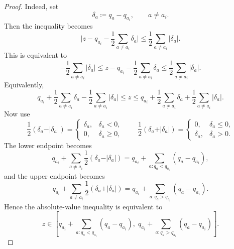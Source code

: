 \documentclass[10pt,a4paper]{amsart}
\begin{document}
\begin{proof}
Indeed, set
\[
    \delta_a \coloneqq q_a-q_{a_i},
    \qquad a\neq a_i.
\]
Then the inequality becomes
\[
    \lvert
        z-q_{a_i}
        -
        \frac12\sum_{a\neq a_i}\delta_a
    \rvert
    \le
    \frac12\sum_{a\neq a_i}\vert \delta_a\vert .
\]
This is equivalent to 
\[
    -\frac12\sum_{a\neq a_i}\vert \delta_a\vert 
    \le
    z-q_{a_i}-\frac12\sum_{a\neq a_i}\delta_a
    \le
    \frac12\sum_{a\neq a_i}\vert \delta_a\vert .
\]
Equivalently,
\[
    q_{a_i}
    +
    \frac12\sum_{a\neq a_i}\delta_a
    -
    \frac12\sum_{a\neq a_i}\vert \delta_a\vert 
    \le z \le
    q_{a_i}
    +
    \frac12\sum_{a\neq a_i}\delta_a
    +
    \frac12\sum_{a\neq a_i}\vert \delta_a\vert .
\]
Now use
\[
    \frac12(\delta_a-\vert \delta_a\vert )
    =
    \begin{cases}
        \delta_a, & \delta_a<0,\\
        0, & \delta_a\ge 0,
    \end{cases}
    \qquad
    \frac12(\delta_a+\vert \delta_a\vert )
    =
    \begin{cases}
        0, & \delta_a\le 0,\\
        \delta_a, & \delta_a>0.
    \end{cases}
\]
The lower endpoint becomes
\[
    q_{a_i}
    +
    \sum_{a\neq a_i}
    \frac12(\delta_a-\vert \delta_a\vert )
    =
    q_{a_i}
    +
    \sum_{a:q_a<q_{a_i}}
    (q_a-q_{a_i}),
\]
and the upper endpoint becomes
\[
    q_{a_i}
    +
    \sum_{a\neq a_i}
    \frac12(\delta_a+\vert \delta_a\vert )
    =
    q_{a_i}
    +
    \sum_{a:q_a>q_{a_i}}
    (q_a-q_{a_i}).
\]
Hence the absolute-value inequality is equivalent to
\[
    z
    \in
    \left[
        q_{a_i}
        +
        \sum_{a:q_a<q_{a_i}}(q_a-q_{a_i}),
        \;
        q_{a_i}
        +
        \sum_{a:q_a>q_{a_i}}(q_a-q_{a_i})
    \right].
\]
\end{proof}
\end{document}
